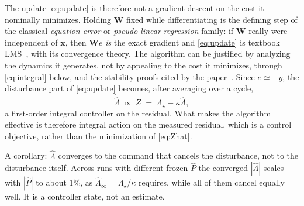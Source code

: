 \documentclass[11pt]{article}
\newcommand{\vx}{\mathbf{x}}
\newcommand{\vW}{\mathbf{W}}
\begin{document}
The update \eqref{eq:update} is therefore not a gradient descent on the cost it nominally minimizes.
%
Holding $\vW$ fixed while differentiating is the defining step of the classical \emph{equation-error} or \emph{pseudo-linear regression} family: if $\vW$ really were independent of $\vx$, then $\vW e$ \emph{is} the exact gradient and \eqref{eq:update} is textbook LMS~\cite{haykin2013}, with its convergence theory.
%
%
%
The algorithm can be justified by analyzing the dynamics it generates, not by appealing to the cost it minimizes, through \eqref{eq:integral} below, and the stability proofs cited by the paper~\cite{pigg2010tcst,pigg2010cdc}.
%
%
Since $e\simeq-y$, the disturbance part of \eqref{eq:update} becomes, after
averaging over a cycle,
%
\begin{equation}
  \dot{\hat\Lambda}\;\propto\;Z\;=\;\Lambda_\star-\kappa\hat\Lambda ,
  \label{eq:integral}
\end{equation}
%
a first-order integral controller on the residual.
%
What makes the algorithm effective is therefore integral action on the
measured residual, which is a control objective, rather than the
minimization of \eqref{eq:Zhat}.

A corollary: $\hat\Lambda$ converges to the command that cancels the disturbance, not to the disturbance itself.
%
Across runs with different frozen $\hat P$ the converged $|\hat\Lambda|$ scales with $|\hat P|$ to about $1\%$, as $\hat\Lambda_\infty=\Lambda_\star/\kappa$ requires, while all of them cancel equally well.
%
It is a controller state, not an estimate.
\end{document}
